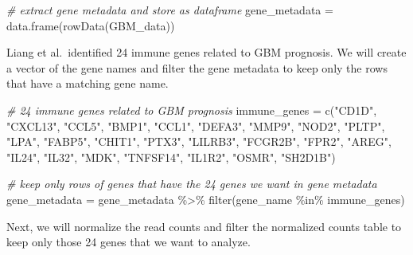 \documentclass[
]{article}
\newenvironment{Shaded}{\begin{snugshade}}{\end{snugshade}}
\newcommand{\CommentTok}[1]{\textcolor[rgb]{0.56,0.35,0.01}{\textit{#1}}}
\newcommand{\FunctionTok}[1]{\textcolor[rgb]{0.00,0.00,0.00}{#1}}
\newcommand{\NormalTok}[1]{#1}
\newcommand{\OtherTok}[1]{\textcolor[rgb]{0.56,0.35,0.01}{#1}}
\newcommand{\SpecialCharTok}[1]{\textcolor[rgb]{0.00,0.00,0.00}{#1}}
\newcommand{\StringTok}[1]{\textcolor[rgb]{0.31,0.60,0.02}{#1}}
\begin{document}
\begin{Shaded}
\begin{Highlighting}[]
\CommentTok{\# extract gene metadata and store as dataframe}
\NormalTok{gene\_metadata }\OtherTok{=} \FunctionTok{data.frame}\NormalTok{(}\FunctionTok{rowData}\NormalTok{(GBM\_data))}
\end{Highlighting}
\end{Shaded}

Liang et al.~identified 24 immune genes related to GBM prognosis. We
will create a vector of the gene names and filter the gene metadata to
keep only the rows that have a matching gene name.

\begin{Shaded}
\begin{Highlighting}[]
\CommentTok{\# 24 immune genes related to GBM prognosis}
\NormalTok{immune\_genes }\OtherTok{=} \FunctionTok{c}\NormalTok{(}\StringTok{"CD1D"}\NormalTok{, }\StringTok{"CXCL13"}\NormalTok{, }\StringTok{"CCL5"}\NormalTok{, }\StringTok{"BMP1"}\NormalTok{, }\StringTok{"CCL1"}\NormalTok{, }\StringTok{"DEFA3"}\NormalTok{, }\StringTok{"MMP9"}\NormalTok{, }
                 \StringTok{"NOD2"}\NormalTok{, }\StringTok{"PLTP"}\NormalTok{, }\StringTok{"LPA"}\NormalTok{, }\StringTok{"FABP5"}\NormalTok{, }\StringTok{"CHIT1"}\NormalTok{, }\StringTok{"PTX3"}\NormalTok{, }\StringTok{"LILRB3"}\NormalTok{, }
                 \StringTok{"FCGR2B"}\NormalTok{, }\StringTok{"FPR2"}\NormalTok{, }\StringTok{"AREG"}\NormalTok{, }\StringTok{"IL24"}\NormalTok{, }\StringTok{"IL32"}\NormalTok{, }\StringTok{"MDK"}\NormalTok{, }\StringTok{"TNFSF14"}\NormalTok{, }
                 \StringTok{"IL1R2"}\NormalTok{, }\StringTok{"OSMR"}\NormalTok{, }\StringTok{"SH2D1B"}\NormalTok{)}

\CommentTok{\# keep only rows of genes that have the 24 genes we want in gene metadata}
\NormalTok{gene\_metadata }\OtherTok{=}\NormalTok{ gene\_metadata }\SpecialCharTok{\%\textgreater{}\%} \FunctionTok{filter}\NormalTok{(gene\_name }\SpecialCharTok{\%in\%}\NormalTok{ immune\_genes)}
\end{Highlighting}
\end{Shaded}

Next, we will normalize the read counts and filter the normalized counts
table to keep only those 24 genes that we want to analyze.
\end{document}
